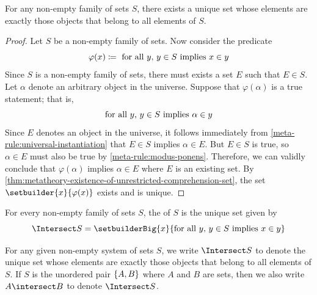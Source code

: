 \begin{thm}
     \label{thm:metatheory-existence-of-intersection-of-a-family-of-sets}
    For any non-empty family of sets \( S \), there exists a unique set whose elements are exactly those objects that belong to all elements of \( S \).
\end{thm}

\begin{proof}
    Let \( S \) be a non-empty family of sets.
    Now consider the predicate
    \begin{equation*}
        \varphi(x) \coloneq \ \text{for all \( y \), \( y \in S \) implies \( x \in y \)}
    \end{equation*}
    Since \( S \) is a non-empty family of sets, there must exists a set \( E \) such that \( E \in S \).
    Let \( \alpha \) denote an arbitrary object in the universe.
    Suppose that \( \varphi(\alpha) \) is a true statement; that is,
    \begin{equation*}
        \text{for all \( y \), \( y \in S \) implies \( \alpha \in y \)}
    \end{equation*}
    Since \( E \) denotes an object in the universe, it follows immediately from \cref{meta-rule:universal-instantiation} that \( E \in S \) implies \( \alpha \in E \).
    But \( E \in S \) is true, so \( \alpha \in E \) must also be true by \cref{meta-rule:modus-ponens}.
    Therefore, we can validly conclude that \( \varphi(\alpha) \) implies \( \alpha \in E \) where \( E \) is an existing set.
    By \cref{thm:metatheory-existence-of-unrestricted-comprehension-set}, the set \( \setbuilder{x}{\varphi(x)} \) exists and is unique.
\end{proof}

\begin{dfn}[Intersection]
     \label{dfn:metatheory-the-intersection-of-a-non-empty-family-of-sets}
    For every non-empty family of sets \( S \), the  of \( S \) is the unique set given by
    \begin{equation*}
        \Intersect S = \setbuilderBig{x}{\text{for all \( y \), \( y \in S \) implies \( x \in y \)}}
    \end{equation*}
\end{dfn}

\begin{notation}
    For any given non-empty system of sets \( S \), we write \( \Intersect S \) to denote the unique set whose elements are exactly those objects that belong to all
    elements of \( S \).
    If \( S \) is the unordered pair \( \mleft\{ A, B \mright\} \) where \( A \) and \( B \) are sets, then we also write \( A \intersect B \) to denote
    \( \Intersect S \).
\end{notation}

